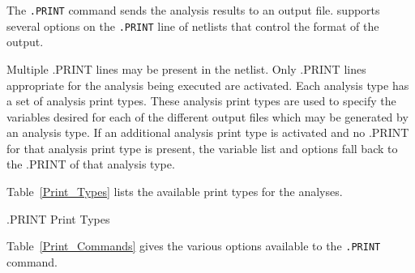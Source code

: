 The \texttt{.PRINT}  command sends the analysis results to
an output file.  \Xyce{} supports several options on the \texttt{.PRINT} line of
netlists that control the format of the output. 

Multiple .PRINT lines may be present in the netlist.  Only .PRINT lines appropriate for the analysis being executed are
activated.  Each analysis type has a set of analysis print types.  These analysis print types are used to specify the variables
desired for each of the different output files which may be generated by an analysis type.  If an additional analysis print type is
activated and no .PRINT for that analysis print type is present, the variable list and options fall back to the .PRINT of that
analysis type.


Table~\ref{Print_Types} lists the available print types for the analyses.

\begin{table}[!htb]
  \centering
  \caption[.PRINT Print Types]{.PRINT Print Types}
  \label{Print_Types}
   
  
\end{table}

Table~\ref{Print_Commands} gives the various options available to the
\texttt{.PRINT} command.  


